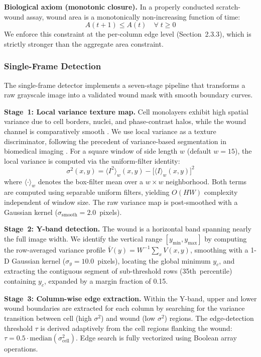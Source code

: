\textbf{Biological axiom (monotonic closure).} In a properly conducted scratch-wound assay, wound area is a monotonically non-increasing function of time:
\begin{equation}\label{eq:axiom}
  \boxed{A(t+1) \leq A(t) \quad \forall\; t \geq 0}
\end{equation}
We enforce this constraint at the per-column edge level (Section~2.3.3), which is strictly stronger than the aggregate area constraint.

\subsubsection{Single-Frame Detection}

The single-frame detector implements a seven-stage pipeline that transforms a raw grayscale image into a validated wound mask with smooth boundary curves.

\textbf{Stage~1: Local variance texture map.}
Cell monolayers exhibit high spatial variance due to cell borders, nuclei, and phase-contrast halos, while the wound channel is comparatively smooth \citep{Yin2012}. We use local variance as a texture discriminator, following the precedent of variance-based segmentation in biomedical imaging \citep{Koenig2017,Loizou2016,Ambrossio2022}. For a square window of side length $w$ (default $w = 15$), the local variance is computed via the uniform-filter identity:
\begin{equation}
  \sigma^2(x, y) = \langle I^2 \rangle_w(x, y) - \bigl[\langle I \rangle_w(x, y)\bigr]^2
\end{equation}
where $\langle \cdot \rangle_w$ denotes the box-filter mean over a $w \times w$ neighborhood. Both terms are computed using separable uniform filters, yielding $O(HW)$ complexity independent of window size. The raw variance map is post-smoothed with a Gaussian kernel ($\sigma_\text{smooth} = 2.0$~pixels).

\textbf{Stage~2: Y-band detection.}
The wound is a horizontal band spanning nearly the full image width. We identify the vertical range $[y_\text{min}, y_\text{max}]$ by computing the row-averaged variance profile $\bar{V}(y) = W^{-1}\sum_x V(x,y)$, smoothing with a 1-D Gaussian kernel ($\sigma_y = 10.0$~pixels), locating the global minimum $y_c$, and extracting the contiguous segment of sub-threshold rows (35th~percentile) containing $y_c$, expanded by a margin fraction of 0.15.

\textbf{Stage~3: Column-wise edge extraction.}
Within the Y-band, upper and lower wound boundaries are extracted for each column by searching for the variance transition between cell (high $\sigma^2$) and wound (low $\sigma^2$) regions. The edge-detection threshold $\tau$ is derived adaptively from the cell regions flanking the wound: $\tau = 0.5 \cdot \mathrm{median}(\sigma^2_\text{cell})$. Edge search is fully vectorized using Boolean array operations.

